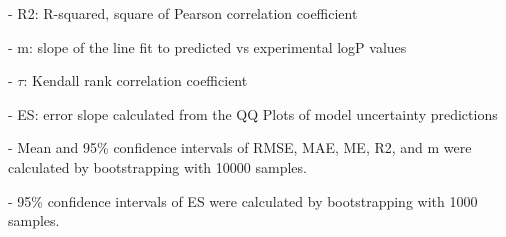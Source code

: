 \documentclass{article}
\begin{document}
- R2: R-squared, square of Pearson correlation coefficient

- m: slope of the line fit to predicted vs experimental logP values

- $\tau$:  Kendall rank correlation coefficient

- ES: error slope calculated from the QQ Plots of model uncertainty predictions

- Mean and 95\% confidence intervals of RMSE, MAE, ME, R2, and m were calculated by bootstrapping with 10000 samples.

- 95\% confidence intervals of ES were calculated by bootstrapping with 1000 samples.\end{document}
\end{document}

